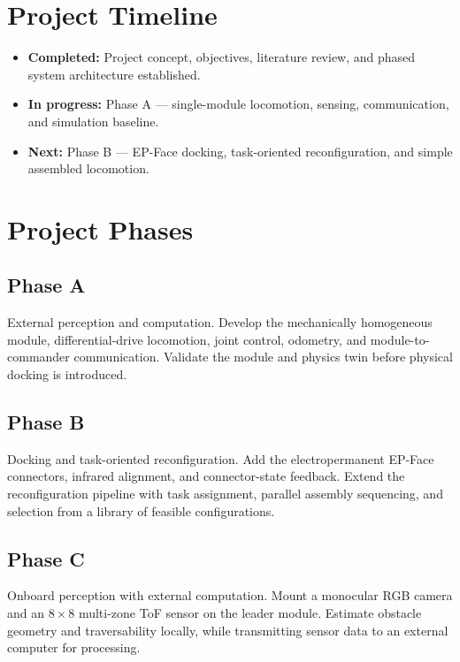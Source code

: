 \documentclass[12pt,a4paper]{article}
\begin{document}
\section{Project Timeline}

\begin{itemize}
	\item \textbf{Completed:} Project concept, objectives, literature review, and
	      phased system architecture established.
	\item \textbf{In progress:} Phase A --- single-module locomotion, sensing,
	      communication, and simulation baseline.
	\item \textbf{Next:} Phase B --- EP-Face docking, task-oriented
	      reconfiguration, and simple assembled locomotion.
\end{itemize}

\section{Project Phases}

\subsection{Phase A}
External perception and computation. Develop the mechanically homogeneous
module, differential-drive locomotion, joint control, odometry, and
module-to-commander communication. Validate the module and physics twin before
physical docking is introduced.

\subsection{Phase B}
Docking and task-oriented reconfiguration. Add the electropermanent EP-Face
connectors, infrared alignment, and connector-state feedback. Extend the
reconfiguration pipeline with task assignment, parallel assembly sequencing,
and selection from a library of feasible configurations.

\subsection{Phase C}
Onboard perception with external computation. Mount a monocular RGB camera and
an $8\times8$ multi-zone ToF sensor on the leader module. Estimate obstacle
geometry and traversability locally, while transmitting sensor data to an
external computer for processing.
\end{document}
